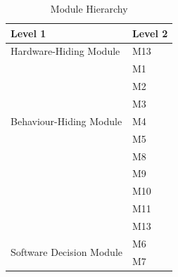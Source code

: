 \documentclass[12pt, titlepage]{article}
\begin{document}
\begin{table}[H]
\centering
\begin{tabular}{p{} p{}}
\toprule
\textbf{Level 1} & \textbf{Level 2}\\
\midrule

{Hardware-Hiding Module} & M13 \\
\midrule

\multirow{7}{0.3\textwidth}{Behaviour-Hiding Module}
& M1\\
& M2\\
& M3\\
& M4\\
& M5\\
& M8\\
& M9\\
& M10\\
& M11\\
& M13\\
\midrule

\multirow{2}{0.3\textwidth}{Software Decision Module} & M6 \\  & M7\\
\bottomrule

\end{tabular}
\caption{Module Hierarchy}
\label{TblMH}
\end{table}
\end{document}
